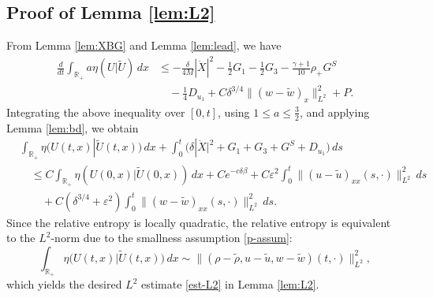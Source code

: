\documentclass[11pt,reqno]{amsart}
\numberwithin{equation}{section} %
\begin{document}
\subsection{Proof of Lemma \ref{lem:L2}}

From Lemma \ref{lem:XBG} and Lemma \ref{lem:lead}, we have 
\begin{align*}
    \frac{d}{dt} \int_{\mathbb{R}_+} a \eta(U|\widetilde{U})\,dx
    &\le -\frac{\delta}{4M}|\dot{X}|^2   -\frac{1}{2}G_1- \frac{1}{2}G_3   -\frac{\gamma+1}{10}\rho_+G^S \\
    &\quad - \frac{1}{4}D_{u_1} +C\delta^{3/4}\|(w-\tilde{w})_x\|_{L^2}^2 + P.
\end{align*}
Integrating the above inequality over $[0,t]$, using $1\le a\le \frac{3}{2}$, and applying Lemma \ref{lem:bd}, we obtain
\begin{align*}
    &\int_{\mathbb{R}_+} \eta(U(t,x)|\widetilde{U}(t,x))\,dx + \int_0^t \big(\delta |\dot{X}|^2 + G_1 + G_3 + G^S + D_{u_1}  \big)\,ds\\
    &\quad \leq C \int_{\mathbb{R}_+}  \eta(U(0,x)|\widetilde{U}(0,x))\,dx  + Ce^{-c\delta \beta} + C\varepsilon^2 \int_0^t  \|(u-\tilde{u})_{xx}(s,\cdot)\|_{L^2}^2 \, ds\\
    &\qquad + C(\delta^{3/4}+\varepsilon^2) \int_0^t  \|(w-\tilde{w})_{xx}(s,\cdot)\|_{L^2}^2 \, ds.
\end{align*}
Since the relative entropy is locally quadratic, the relative entropy is equivalent to the $L^2$-norm due to the smallness assumption \eqref{p-assum}:
\[
     \int_{\mathbb{R}_+} \eta \big(U(t,x)|\widetilde{U}(t,x) \big)\,dx \sim \|(\rho - \tilde{\rho}, u - \tilde{u}, w-\tilde{w}) (t,\cdot) \|_{L^2}^2,
\]
which yields the desired $L^2$ estimate \eqref{est-L2} in Lemma \ref{lem:L2}.
\end{document}
